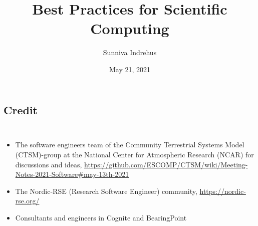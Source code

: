 \documentclass[usenames,dvipsnames]{beamer}
\theoremstyle{plain}
\theoremstyle{definition}
\begin{document}
\title{Best Practices for Scientific Computing}
 \institute{
A case study for NGI
 }

 \author{Sunniva Indrehus }


 \date{\scriptsize May 21, 2021}

 \vspace{-2.cm}
 \frame{
   \titlepage
   \thispagestyle{empty}
 }


\section{}
\subsection{Credit}


\begin{frame}{\setframetitle{}}
  {
    \begin{columns}
      \begin{itemize}
        \item The software engineers team of the Community Terrestrial Systems Model
          (CTSM)-group at the National Center for Atmospheric Research (NCAR)
          for discussions and ideas, \url{https://github.com/ESCOMP/CTSM/wiki/Meeting-Notes-2021-Software#may-13th-2021}
        \item The Nordic-RSE (Research Software Engineer) community,
            \url{https://nordic-rse.org/}
        \item Consultants and engineers in Cognite and BearingPoint 
        \end{itemize}

    \end{columns}
  }
\end{frame}
\end{document}
